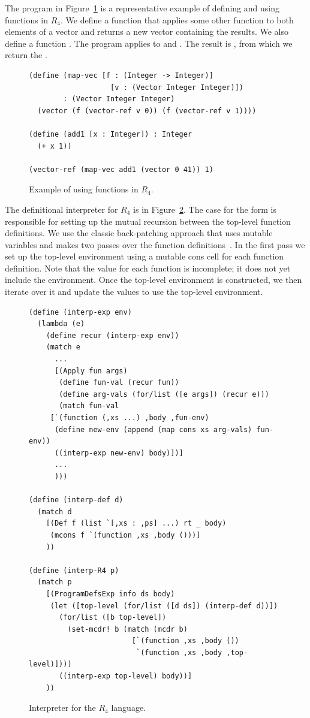 \documentclass[11pt]{book}
\begin{document}
The program in Figure~\ref{fig:r4-function-example} is a
representative example of defining and using functions in $R_4$.  We
define a function  that applies some other function
 to both elements of a vector and returns a new
vector containing the results. We also define a function .
The program applies
 to  and .  The result is
, from which we return the .

\begin{figure}[tbp]
\begin{lstlisting}
(define (map-vec [f : (Integer -> Integer)]
                   [v : (Vector Integer Integer)])
        : (Vector Integer Integer)
  (vector (f (vector-ref v 0)) (f (vector-ref v 1))))

(define (add1 [x : Integer]) : Integer
  (+ x 1))

(vector-ref (map-vec add1 (vector 0 41)) 1)
\end{lstlisting}
\caption{Example of using functions in $R_4$.}
\label{fig:r4-function-example}
\end{figure}

The definitional interpreter for $R_4$ is in
Figure~\ref{fig:interp-R4}. The case for the  form is
responsible for setting up the mutual recursion between the top-level
function definitions. We use the classic back-patching 
approach that uses mutable variables and makes two passes over the function
definitions~\citep{Kelsey:1998di}.  In the first pass we set up the
top-level environment using a mutable cons cell for each function
definition. Note that the  value for each function is
incomplete; it does not yet include the environment.  Once the
top-level environment is constructed, we then iterate over it and
update the  values to use the top-level environment.

\begin{figure}[tp]
\begin{lstlisting}
(define (interp-exp env)
  (lambda (e)
    (define recur (interp-exp env))
    (match e
      ...
      [(Apply fun args)
       (define fun-val (recur fun))
       (define arg-vals (for/list ([e args]) (recur e)))
       (match fun-val
	 [`(function (,xs ...) ,body ,fun-env)
	  (define new-env (append (map cons xs arg-vals) fun-env))
	  ((interp-exp new-env) body)])]
      ...
      )))

(define (interp-def d)
  (match d
    [(Def f (list `[,xs : ,ps] ...) rt _ body)
     (mcons f `(function ,xs ,body ()))]
    ))

(define (interp-R4 p)
  (match p
    [(ProgramDefsExp info ds body)
     (let ([top-level (for/list ([d ds]) (interp-def d))])
       (for/list ([b top-level])
         (set-mcdr! b (match (mcdr b)
                        [`(function ,xs ,body ())
                         `(function ,xs ,body ,top-level)])))
       ((interp-exp top-level) body))]
    ))
\end{lstlisting}
\caption{Interpreter for the $R_4$ language.}
\label{fig:interp-R4}
\end{figure}
\end{document}
